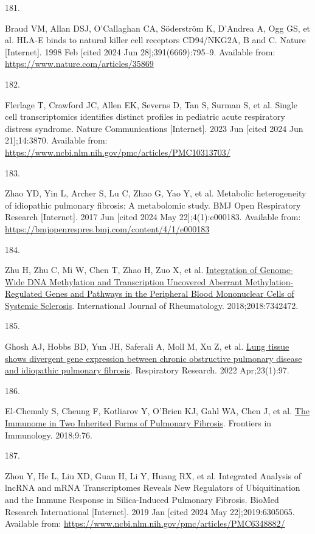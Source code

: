 \documentclass[
]{article}
\newlength{\cslhangindent}
\newlength{\csllabelwidth}
\newenvironment{CSLReferences}[2] %
 {\begin{list}{}{%
  \setlength{\itemindent}{0pt}
  \setlength{\leftmargin}{0pt}
  \setlength{\parsep}{0pt}
  \ifodd #1
   \setlength{\leftmargin}{\cslhangindent}
   \setlength{\itemindent}{-1\cslhangindent}
  \fi
  \setlength{\itemsep}{#2\baselineskip}}}
 {\end{list}}
\newcommand{\CSLLeftMargin}[1]{\parbox[t]{\csllabelwidth}{\strut#1\strut}}
\newcommand{\CSLRightInline}[1]{\parbox[t]{\linewidth - \csllabelwidth}{\strut#1\strut}}
\begin{document}
\begin{CSLReferences}{0}{1}
\CSLLeftMargin{181. }%
\CSLRightInline{Braud VM, Allan DSJ, O'Callaghan CA, Söderström K, D'Andrea A, Ogg GS, et al. {HLA}-{E} binds to natural killer cell receptors {CD94}/{NKG2A}, {B} and {C}. Nature {[}Internet{]}. 1998 Feb {[}cited 2024 Jun 28{]};391(6669):795--9. Available from: \url{https://www.nature.com/articles/35869}}

\CSLLeftMargin{182. }%
\CSLRightInline{Flerlage T, Crawford JC, Allen EK, Severns D, Tan S, Surman S, et al. Single cell transcriptomics identifies distinct profiles in pediatric acute respiratory distress syndrome. Nature Communications {[}Internet{]}. 2023 Jun {[}cited 2024 Jun 21{]};14:3870. Available from: \url{https://www.ncbi.nlm.nih.gov/pmc/articles/PMC10313703/}}

\CSLLeftMargin{183. }%
\CSLRightInline{Zhao YD, Yin L, Archer S, Lu C, Zhao G, Yao Y, et al. Metabolic heterogeneity of idiopathic pulmonary fibrosis: A metabolomic study. BMJ Open Respiratory Research {[}Internet{]}. 2017 Jun {[}cited 2024 May 22{]};4(1):e000183. Available from: \url{https://bmjopenrespres.bmj.com/content/4/1/e000183}}

\CSLLeftMargin{184. }%
\CSLRightInline{Zhu H, Zhu C, Mi W, Chen T, Zhao H, Zuo X, et al. \href{https://doi.org/10.1155/2018/7342472}{Integration of {Genome}-{Wide} {DNA} {Methylation} and {Transcription} {Uncovered} {Aberrant} {Methylation}-{Regulated} {Genes} and {Pathways} in the {Peripheral} {Blood} {Mononuclear} {Cells} of {Systemic} {Sclerosis}}. International Journal of Rheumatology. 2018;2018:7342472. }

\CSLLeftMargin{185. }%
\CSLRightInline{Ghosh AJ, Hobbs BD, Yun JH, Saferali A, Moll M, Xu Z, et al. \href{https://doi.org/10.1186/s12931-022-02013-w}{Lung tissue shows divergent gene expression between chronic obstructive pulmonary disease and idiopathic pulmonary fibrosis}. Respiratory Research. 2022 Apr;23(1):97. }

\CSLLeftMargin{186. }%
\CSLRightInline{El-Chemaly S, Cheung F, Kotliarov Y, O'Brien KJ, Gahl WA, Chen J, et al. \href{https://doi.org/10.3389/fimmu.2018.00076}{The {Immunome} in {Two} {Inherited} {Forms} of {Pulmonary} {Fibrosis}}. Frontiers in Immunology. 2018;9:76. }

\CSLLeftMargin{187. }%
\CSLRightInline{Zhou Y, He L, Liu XD, Guan H, Li Y, Huang RX, et al. Integrated {Analysis} of {lncRNA} and {mRNA} {Transcriptomes} {Reveals} {New} {Regulators} of {Ubiquitination} and the {Immune} {Response} in {Silica}-{Induced} {Pulmonary} {Fibrosis}. BioMed Research International {[}Internet{]}. 2019 Jan {[}cited 2024 May 22{]};2019:6305065. Available from: \url{https://www.ncbi.nlm.nih.gov/pmc/articles/PMC6348882/}}


\end{CSLReferences}
\end{document}
